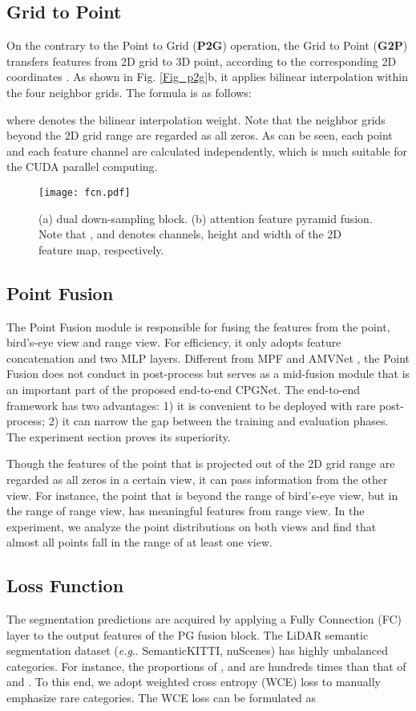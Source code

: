 \documentclass[letterpaper, 10 pt, conference]{ieeeconf}
\makeatletter
\DeclareRobustCommand\onedot{\futurelet\@let@token\@onedot}
\def\@onedot{\ifx\@let@token.\else.\null\fi\xspace}
\def\eg{\emph{e.g}\onedot} \def\Eg{\emph{E.g}\onedot}
\makeatother
\begin{document}
\subsection{Grid to Point}
On the contrary to the Point to Grid ({\bf P2G}) operation, the Grid to Point ({\bf G2P}) transfers features from 2D grid to 3D point, according to the corresponding 2D coordinates . As shown in Fig. \ref{Fig_p2g}b, it applies bilinear interpolation within the four neighbor grids. The formula is as follows:

where  denotes the bilinear interpolation weight. Note that the neighbor grids beyond the 2D grid range are regarded as all zeros. As can be seen, each point and each feature channel are calculated independently, which is much suitable for the CUDA parallel computing.

\begin{figure}[t]
\centering
\texttt{[image: fcn.pdf]}
\caption{(a) dual down-sampling block. (b) attention feature pyramid fusion. Note that ,  and  denotes channels, height and width of the 2D feature map, respectively.}
\label{Fig_fcn}
\end{figure}

\subsection{Point Fusion}
The Point Fusion module is responsible for fusing the features from the point, bird’s-eye view and range view. For efficiency, it only adopts feature concatenation and two MLP layers. Different from MPF \cite{alnaggar2021multi} and AMVNet \cite{liong2020amvnet}, the Point Fusion does not conduct in post-process but serves as a mid-fusion module that is an important part of the proposed end-to-end CPGNet. The end-to-end framework has two advantages: 1) it is convenient to be deployed with rare post-process; 2) it can narrow the gap between the training and evaluation phases. The experiment section proves its superiority.

Though the features of the point that is projected out of the 2D grid range are regarded as all zeros in a certain view, it can pass information from the other view. For instance, the point that is beyond the range of bird’s-eye view, but in the range of range view, has meaningful features from range view. In the experiment, we analyze the point distributions on both views and find that almost all points fall in the range of at least one view.

\subsection{Loss Function}
The segmentation predictions are acquired by applying a Fully Connection (FC) layer to the output features of the PG fusion block. The LiDAR semantic segmentation dataset (\eg SemanticKITTI, nuScenes) has highly unbalanced categories. For instance, the proportions of ,  and  are hundreds times than that of  and . To this end, we adopt weighted cross entropy (WCE) loss to manually emphasize rare categories. The WCE loss can be formulated as
\end{document}
